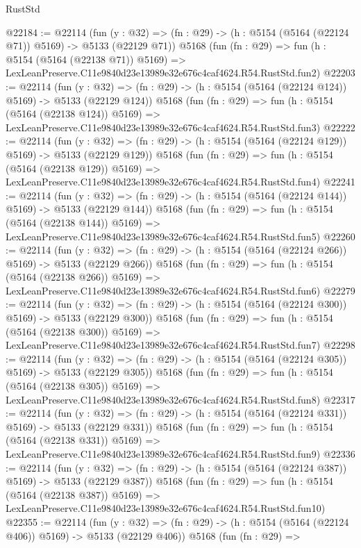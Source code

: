\begin{lexlean}{RustStd}
\begin{coremodule}
@22184 := @22114
    (fun (y : @32) => (fn : @29) -> (h : @5154 (@5164 (@22124 @71)) @5169) -> @5133 (@22129 @71))
    @5168
    (fun (fn : @29) =>
    fun (h : @5154 (@5164 (@22138 @71)) @5169) =>
    LexLeanPreserve.C11e9840d23e13989e32e676c4caf4624.R54.RustStd.fun2)
@22203 := @22114
    (fun (y : @32) => (fn : @29) -> (h : @5154 (@5164 (@22124 @124)) @5169) -> @5133 (@22129 @124))
    @5168
    (fun (fn : @29) =>
    fun (h : @5154 (@5164 (@22138 @124)) @5169) =>
    LexLeanPreserve.C11e9840d23e13989e32e676c4caf4624.R54.RustStd.fun3)
@22222 := @22114
    (fun (y : @32) => (fn : @29) -> (h : @5154 (@5164 (@22124 @129)) @5169) -> @5133 (@22129 @129))
    @5168
    (fun (fn : @29) =>
    fun (h : @5154 (@5164 (@22138 @129)) @5169) =>
    LexLeanPreserve.C11e9840d23e13989e32e676c4caf4624.R54.RustStd.fun4)
@22241 := @22114
    (fun (y : @32) => (fn : @29) -> (h : @5154 (@5164 (@22124 @144)) @5169) -> @5133 (@22129 @144))
    @5168
    (fun (fn : @29) =>
    fun (h : @5154 (@5164 (@22138 @144)) @5169) =>
    LexLeanPreserve.C11e9840d23e13989e32e676c4caf4624.R54.RustStd.fun5)
@22260 := @22114
    (fun (y : @32) => (fn : @29) -> (h : @5154 (@5164 (@22124 @266)) @5169) -> @5133 (@22129 @266))
    @5168
    (fun (fn : @29) =>
    fun (h : @5154 (@5164 (@22138 @266)) @5169) =>
    LexLeanPreserve.C11e9840d23e13989e32e676c4caf4624.R54.RustStd.fun6)
@22279 := @22114
    (fun (y : @32) => (fn : @29) -> (h : @5154 (@5164 (@22124 @300)) @5169) -> @5133 (@22129 @300))
    @5168
    (fun (fn : @29) =>
    fun (h : @5154 (@5164 (@22138 @300)) @5169) =>
    LexLeanPreserve.C11e9840d23e13989e32e676c4caf4624.R54.RustStd.fun7)
@22298 := @22114
    (fun (y : @32) => (fn : @29) -> (h : @5154 (@5164 (@22124 @305)) @5169) -> @5133 (@22129 @305))
    @5168
    (fun (fn : @29) =>
    fun (h : @5154 (@5164 (@22138 @305)) @5169) =>
    LexLeanPreserve.C11e9840d23e13989e32e676c4caf4624.R54.RustStd.fun8)
@22317 := @22114
    (fun (y : @32) => (fn : @29) -> (h : @5154 (@5164 (@22124 @331)) @5169) -> @5133 (@22129 @331))
    @5168
    (fun (fn : @29) =>
    fun (h : @5154 (@5164 (@22138 @331)) @5169) =>
    LexLeanPreserve.C11e9840d23e13989e32e676c4caf4624.R54.RustStd.fun9)
@22336 := @22114
    (fun (y : @32) => (fn : @29) -> (h : @5154 (@5164 (@22124 @387)) @5169) -> @5133 (@22129 @387))
    @5168
    (fun (fn : @29) =>
    fun (h : @5154 (@5164 (@22138 @387)) @5169) =>
    LexLeanPreserve.C11e9840d23e13989e32e676c4caf4624.R54.RustStd.fun10)
@22355 := @22114
    (fun (y : @32) => (fn : @29) -> (h : @5154 (@5164 (@22124 @406)) @5169) -> @5133 (@22129 @406))
    @5168
    (fun (fn : @29) =>

\end{coremodule}
\end{lexlean}
